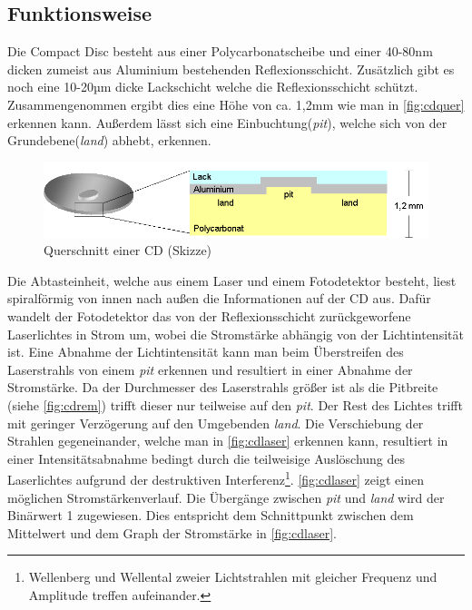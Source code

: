 \subsection{Funktionsweise}
\label{subsec:cdfunktionsweise}

Die Compact Disc besteht aus einer Polycarbonatscheibe und einer 40-80nm dicken
zumeist aus Aluminium bestehenden Reflexionsschicht. Zusätzlich gibt es noch
eine 10-20µm dicke Lackschicht welche die Reflexionsschicht schützt.
Zusammengenommen ergibt dies eine Höhe von ca. 1,2mm wie man in
\autoref{fig:cdquer} erkennen kann. Außerdem lässt sich eine
Einbuchtung(\textit{pit}), welche sich von der Grundebene(\textit{land}) abhebt,
erkennen. \cite{cfcd}

\begin{figure}[h]
  \begin{center}
      \begin{minipage}[t]{\textwidth}
        \begin{center}
            \includegraphics[height=0.1\textheight]{Bilder/Optische_Datentraeger_Die_Compact_Disc/Funktionsweise/cdquer.png}
            \caption[Querschnitt einer CD (Skizze) \newline \url{http://daten.didaktikchemie.uni-bayreuth.de/umat/cd_dvd/cd_dvd.htm} (zuletzt aufgerufen am 07.08.2015)]{Querschnitt einer CD (Skizze)}
            \label{fig:cdquer}
        \end{center}
      \end{minipage}
  \end{center}
\end{figure}

Die Abtasteinheit, welche aus einem Laser und einem Fotodetektor besteht, liest
spiralförmig von innen nach außen die Informationen auf der CD aus. Dafür
wandelt der Fotodetektor das von der Reflexionsschicht zurückgeworfene
Laserlichtes in Strom um, wobei die Stromstärke abhängig von der Lichtintensität
ist. Eine Abnahme der Lichtintensität kann man beim Überstreifen des
Laserstrahls von einem \textit{pit} erkennen und resultiert in einer Abnahme der
Stromstärke. Da der Durchmesser des Laserstrahls größer ist als die Pitbreite
(siehe \autoref{fig:cdrem}) trifft dieser nur teilweise auf den \textit{pit}.
Der Rest des Lichtes trifft mit geringer Verzögerung auf den Umgebenden
\textit{land}. Die Verschiebung der Strahlen gegeneinander, welche man in
\autoref{fig:cdlaser} erkennen kann, resultiert in einer Intensitätsabnahme
bedingt durch die teilweisige Auslöschung des Laserlichtes aufgrund der
destruktiven Interferenz\footnote{Wellenberg und Wellental zweier Lichtstrahlen
mit gleicher Frequenz und Amplitude treffen aufeinander.}. \autoref{fig:cdlaser}
zeigt einen möglichen Stromstärkenverlauf. Die Übergänge zwischen \textit{pit}
und \textit{land} wird der Binärwert 1 zugewiesen. Dies entspricht dem
Schnittpunkt zwischen dem Mittelwert und dem Graph der Stromstärke in
\autoref{fig:cdlaser}. \cite{cdp}

